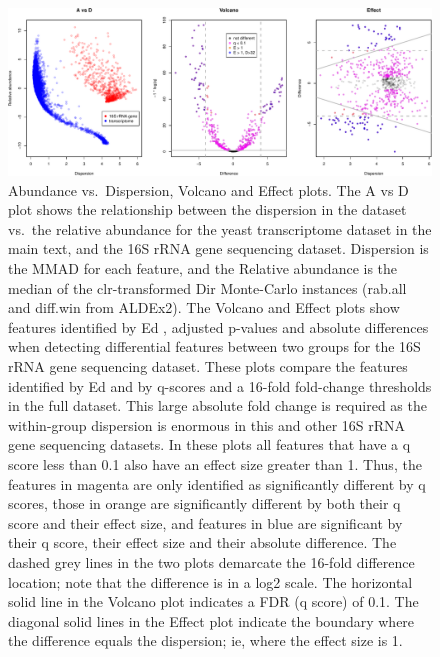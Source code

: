 \documentclass[onecolumn]{article}
\begin{document}
\begin{figure}
\centering
\includegraphics{effect_supplement_files/figure-latex/R-block-ty-volcano-1.pdf}
\caption{Abundance vs.~Dispersion, Volcano and Effect plots. The A vs D
plot shows the relationship between the dispersion in the dataset
vs.~the relative abundance for the yeast transcriptome dataset in the
main text, and the 16S rRNA gene sequencing dataset. Dispersion is the
MMAD for each feature, and the Relative abundance is the median of the
clr-transformed Dir Monte-Carlo instances (rab.all and diff.win from
ALDEx2). The Volcano and Effect plots show features identified by Ed ,
adjusted p-values and absolute differences when detecting differential
features between two groups for the 16S rRNA gene sequencing dataset.
These plots compare the features identified by Ed and by q-scores and a
16-fold fold-change thresholds in the full dataset. This large absolute
fold change is required as the within-group dispersion is enormous in
this and other 16S rRNA gene sequencing datasets. In these plots all
features that have a q score less than 0.1 also have an effect size
greater than 1. Thus, the features in magenta are only identified as
significantly different by q scores, those in orange are significantly
different by both their q score and their effect size, and features in
blue are significant by their q score, their effect size and their
absolute difference. The dashed grey lines in the two plots demarcate
the 16-fold difference location; note that the difference is in a log2
scale. The horizontal solid line in the Volcano plot indicates a FDR (q
score) of 0.1. The diagonal solid lines in the Effect plot indicate the
boundary where the difference equals the dispersion; ie, where the
effect size is 1.}
\end{figure}

\clearpage
\end{document}
